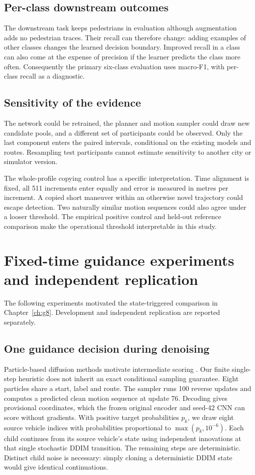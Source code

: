 \section{Per-class downstream outcomes}

The downstream task keeps pedestrians in evaluation although augmentation adds no pedestrian traces. Their recall can therefore change: adding examples of other classes changes the learned decision boundary. Improved recall in a class can also come at the expense of precision if the learner predicts the class more often. Consequently the primary six-class evaluation uses macro-F1, with per-class recall as a diagnostic.

\section{Sensitivity of the evidence}
The network could be retrained, the planner and motion sampler could draw new candidate pools, and a different set of participants could be observed. Only the last component enters the paired intervals, conditional on the existing models and routes. Resampling test participants cannot estimate sensitivity to another city or simulator version.

The whole-profile copying control has a specific interpretation. Time alignment is fixed, all 511 increments enter equally and error is measured in metres per increment. A copied short maneuver within an otherwise novel trajectory could escape detection. Two naturally similar motion sequences could also agree under a looser threshold. The empirical positive control and held-out reference comparison make the operational threshold interpretable in this study.

\chapter{Fixed-time guidance experiments and independent replication}
\label{app:fixedtime}
The following experiments motivated the state-triggered comparison in Chapter~\ref{ch:g8}. Development and independent replication are reported separately.
\section{One guidance decision during denoising}
Particle-based diffusion methods motivate intermediate scoring \cite{tds}. Our finite single-step heuristic does not inherit an exact conditional sampling guarantee. Eight particles share a start, label and route. The sampler runs 100 reverse updates and computes a predicted clean motion sequence at update 76. Decoding gives provisional coordinates, which the frozen original encoder and seed-42 CNN can score without gradients. With positive target probabilities $p_k$, we draw eight source vehicle indices with probabilities proportional to $\max(p_k,10^{-6})$. Each child continues from its source vehicle's state using independent innovations at that single stochastic DDIM transition. The remaining steps are deterministic. Distinct child noise is necessary: simply cloning a deterministic DDIM state would give identical continuations.

